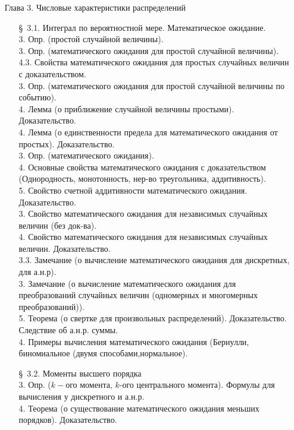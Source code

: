 \documentclass[10pt]{amsart}
\begin{document}
\begin{enumerate}
    
\item[Глава 3.] Числовые характеристики распределений \\
    
\begin{enumerate}
\item[\S\, 3.1.] Интеграл по вероятностной мере. Математическое ожидание. \\
3. Опр. (простой случайной величины). \\
3. Опр. (математического ожидания для простой случайной величины). \\
4.3. Свойства математического ожидания для  простых случайных величин с доказательством. \\
3. Опр. (математического ожидания для простой случайной величины по событию). \\
4. Лемма (о приближение случайной величины простыми). Доказательство. \\
4. Лемма (о единственности предела для математического ожидания от простых). Доказательство. \\ 
3. Опр. (математического ожидания). \\
4. Основные свойства математического ожидания с доказательством (Однородность, монотонность, нер-во треугольника, аддитивность). \\
5.  Свойство счетной аддитивности математического ожидания. Доказательство. \\
3. Свойство  математического ожидания для независимых случайных величин (без док-ва). \\
4. Свойство  математического ожидания для независимых случайных величин. Доказательство. \\
3.3. Замечание (о вычисление  математического ожидания для дискретных, для а.н.р). \\
3. Замечание (о вычисление  математического ожидания для преобразований случайных величин (одномерных и многомерных преобразований)). \\
5. Теорема (о свертке для произвольных распределений). Доказательство. Следствие об а.н.р. суммы. \\ 
4. Примеры вычисления математического ожидания (Бернулли, биномиальное (двумя способами,нормальное). \\


\item[\S\, 3.2.] Моменты высшего порядка \\
3. Опр. ($k-$ого момента, $k$-ого центрального момента). Формулы для вычисления у дискретного и а.н.р. \\
4. Теорема (о существование математического ожидания меньших порядков). Доказательство. \\



\end{enumerate}
\end{enumerate}
\end{document}
